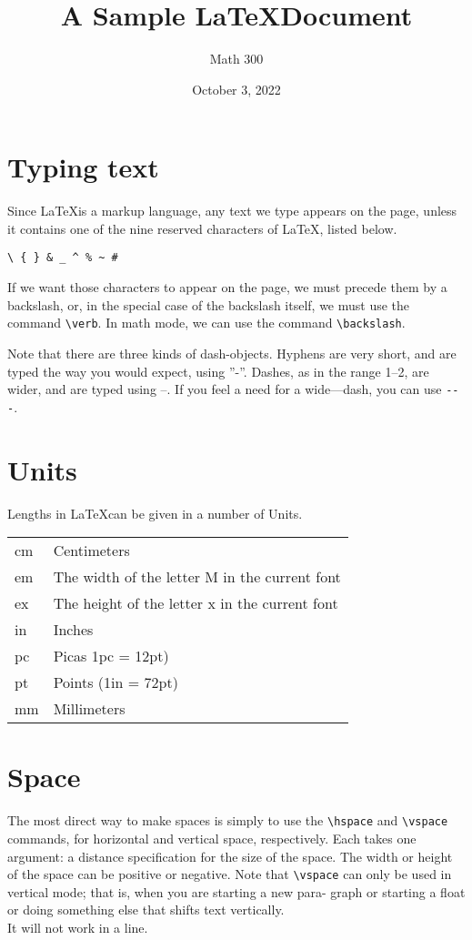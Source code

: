 \documentclass[12pt]{article}
\title{A Sample \LaTeX Document}
\author{Math 300}
\date{October 3, 2022}
\begin{document}
\maketitle
\section{Typing text}
Since \LaTeX is a markup language, any text we type appears on the page,
unless it contains one of the nine reserved characters of \LaTeX, listed below.
\begin{verbatim}
\ { } & _ ^ % ~ #
\end{verbatim}
If we want those characters to appear on the page, we must precede them by
a backslash, or, in the special case of the backslash itself, we must use the
command \verb|\verb|. In math mode, we can use the command \verb|\backslash|.

Note that there are three kinds of dash-objects. Hyphens are very short,
and are typed the way you would expect, using ”-”. Dashes, as in the range
1–2, are wider, and are typed using --. If you feel a need for a wide—dash,
you can use \verb|---|.
\section{Units}
Lengths in \LaTeX can be given in a number of Units.\\
\begin{tabular}{ll}
cm & Centimeters\\
em & The width of the letter M in the current font\\
ex & The height of the letter x in the current font\\
in & Inches\\
pc & Picas 1pc = 12pt)\\
pt & Points (1in = 72pt)\\
mm & Millimeters\\
\end{tabular}

\pagebreak
\section{Space}
The most direct way to make spaces is simply to use the \verb|\hspace| and
\verb|\vspace| commands, for horizontal and vertical space, respectively. Each
takes one argument: a distance specification for the size of the space. The
width or height of the space can be positive or negative. Note that \verb|\vspace|
can only be used in vertical mode; that is, when you are starting a new para-
graph or starting a float or doing something else that shifts text vertically.\\
It will not work in a line.
\end{document}
